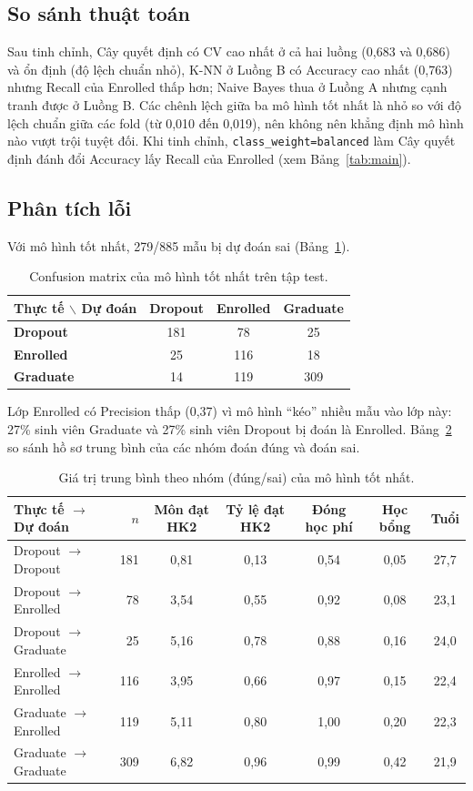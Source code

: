 \documentclass[12pt,a4paper]{article}
\begin{document}
\subsection{So sánh thuật toán}
Sau tinh chỉnh, Cây quyết định có CV cao nhất ở cả hai luồng (0,683 và 0,686) và ổn định (độ lệch chuẩn nhỏ), K-NN ở Luồng B có
Accuracy cao nhất (0,763) nhưng Recall của Enrolled thấp hơn; Naive Bayes thua ở Luồng A nhưng cạnh tranh được ở Luồng B. Các chênh lệch giữa ba mô hình
tốt nhất là nhỏ so với độ lệch chuẩn giữa các fold (từ 0,010 đến 0,019), nên không nên khẳng định mô hình nào vượt trội tuyệt đối. Khi tinh chỉnh,
\texttt{class\_weight=balanced} làm Cây quyết định đánh đổi Accuracy lấy Recall của Enrolled (xem Bảng~\ref{tab:main}).

\subsection{Phân tích lỗi}
Với mô hình tốt nhất, 279/885 mẫu bị dự đoán sai (Bảng~\ref{tab:conf}).
\begin{table}[H]\centering\small
\begin{tabular}{@{}lccc@{}}\toprule
Thực tế $\backslash$ Dự đoán & Dropout & Enrolled & Graduate\\\midrule
\textbf{Dropout} & 181 & 78 & 25 \\
\textbf{Enrolled} & 25 & 116 & 18 \\
\textbf{Graduate} & 14 & 119 & 309 \\
\bottomrule\end{tabular}\caption{Confusion matrix của mô hình tốt nhất trên tập test.}\label{tab:conf}\end{table}
Lớp Enrolled có Precision thấp (0,37) vì mô hình ``kéo'' nhiều mẫu vào lớp này: 27\% sinh viên Graduate và 27\% sinh viên Dropout
bị đoán là Enrolled. Bảng~\ref{tab:err} so sánh hồ sơ trung bình của các nhóm đoán đúng và đoán sai.
\begin{table}[H]\centering\small
\begin{tabular}{@{}lrccccc@{}}\toprule
Thực tế $\to$ Dự đoán & $n$ & Môn đạt HK2 & Tỷ lệ đạt HK2 & Đóng học phí & Học bổng & Tuổi\\\midrule
Dropout $\to$ Dropout & 181 & 0,81 & 0,13 & 0,54 & 0,05 & 27,7 \\
Dropout $\to$ Enrolled & 78 & 3,54 & 0,55 & 0,92 & 0,08 & 23,1 \\
Dropout $\to$ Graduate & 25 & 5,16 & 0,78 & 0,88 & 0,16 & 24,0 \\
Enrolled $\to$ Enrolled & 116 & 3,95 & 0,66 & 0,97 & 0,15 & 22,4 \\
Graduate $\to$ Enrolled & 119 & 5,11 & 0,80 & 1,00 & 0,20 & 22,3 \\
Graduate $\to$ Graduate & 309 & 6,82 & 0,96 & 0,99 & 0,42 & 21,9 \\
\bottomrule\end{tabular}\caption{Giá trị trung bình theo nhóm (đúng/sai) của mô hình tốt nhất.}\label{tab:err}\end{table}
\end{document}
